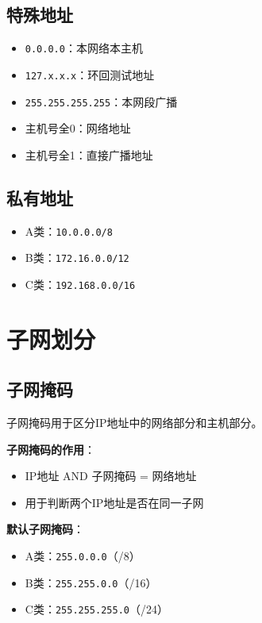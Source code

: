 \subsection{特殊地址}
\begin{itemize}[leftmargin=2em,itemsep=0pt]
    \item \texttt{0.0.0.0}：本网络本主机
    \item \texttt{127.x.x.x}：环回测试地址
    \item \texttt{255.255.255.255}：本网段广播
    \item 主机号全0：网络地址
    \item 主机号全1：直接广播地址
\end{itemize}

\subsection{私有地址}
\begin{itemize}[leftmargin=2em,itemsep=0pt]
    \item A类：\texttt{10.0.0.0/8}
    \item B类：\texttt{172.16.0.0/12}
    \item C类：\texttt{192.168.0.0/16}
\end{itemize}

\section{子网划分}
\subsection{子网掩码}
子网掩码用于区分IP地址中的网络部分和主机部分。

\textbf{子网掩码的作用}：
\begin{itemize}[leftmargin=2em,itemsep=0pt]
    \item IP地址 AND 子网掩码 = 网络地址
    \item 用于判断两个IP地址是否在同一子网
\end{itemize}

\textbf{默认子网掩码}：
\begin{itemize}[leftmargin=2em,itemsep=0pt]
    \item A类：\texttt{255.0.0.0}（/8）
    \item B类：\texttt{255.255.0.0}（/16）
    \item C类：\texttt{255.255.255.0}（/24）
\end{itemize}

